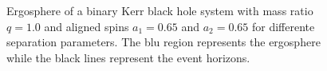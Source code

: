 \begin{figure}
{    \label{ch:penrose_binaries/fig:ergo_equal_c}
  }
  \caption{Ergosphere of a binary Kerr black hole system with mass ratio $q=1.0$ and aligned spins $a_1=0.65$ and $a_2=0.65$ for differente separation parameters. The blu region represents the ergosphere while the black lines represent the event horizons.}
  \label{ch:penrose_binaries/fig:ergo_equal_spin}
\end{figure}

